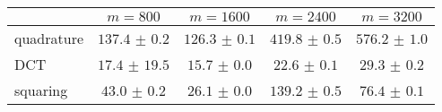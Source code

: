\centering
\renewcommand{\arraystretch}{1.2}
\begin{tabular}{@{}lcccc@{}}
\toprule
 & $m=800$ & $m=1600$ & $m=2400$ & $m=3200$\\
\midrule
quadrature & $137.4$ $\pm$ $0.2$ & $126.3$ $\pm$ $0.1$ & $419.8$ $\pm$ $0.5$ & $576.2$ $\pm$ $1.0$ \\
DCT & $17.4$ $\pm$ $19.5$ & $15.7$ $\pm$ $0.0$ & $22.6$ $\pm$ $0.1$ & $29.3$ $\pm$ $0.2$ \\
squaring & $43.0$ $\pm$ $0.2$ & $26.1$ $\pm$ $0.0$ & $139.2$ $\pm$ $0.5$ & $76.4$ $\pm$ $0.1$ \\
\bottomrule
\end{tabular}
